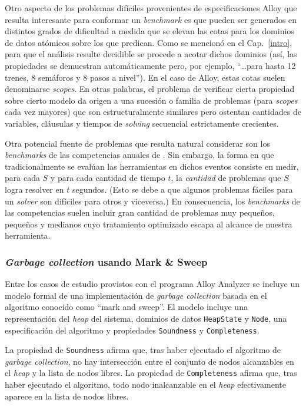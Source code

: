 Otro aspecto de los problemas difíciles provenientes de especificaciones Alloy que resulta interesante para conformar un \emph{benchmark} es que pueden ser generados en distintos grados de dificultad a medida que se elevan las cotas para los dominios de datos atómicos sobre los que predican. Como se mencionó en el Cap.~\ref{intro}, para que el análisis resulte decidible se procede a acotar dichos dominios (así, las propiedades se demuestran automáticamente pero, por ejemplo, ``\ldots para hasta 12 trenes, 8 semáforos y 8 pasos a nivel''). En el caso de Alloy, estas cotas suelen denominarse \emph{scopes}. En otras palabras, el problema de verificar cierta propiedad sobre cierto modelo da origen a una sucesión o familia de problemas (para \emph{scopes} cada vez mayores) que son estructuralmente similares pero ostentan cantidades de variables, cláusulas y tiempos de \emph{solving} secuencial estrictamente crecientes.

Otra potencial fuente de problemas que resulta natural considerar son los \emph{benchmarks} de las competencias anuales de \ssolving. Sin embargo, la forma en que tradicionalmente se evalúan las herramientas en dichos eventos consiste en medir, para cada \ssolver $S$ y para cada cantidad de tiempo $t$, la \emph{cantidad} de problemas que $S$ logra resolver en $t$ segundos. (Esto se debe a que algunos problemas fáciles para un \emph{solver} son difíciles para otros y viceversa.) En consecuencia, los \emph{benchmarks} de las competencias suelen incluir gran cantidad de problemas muy pequeños, pequeños y medianos cuyo tratamiento optimizado escapa al alcance de nuestra herramienta.


\subsubsection{\emph{Garbage collection} usando Mark \& Sweep}

Entre los casos de estudio provistos con el programa Alloy Analyzer se incluye un modelo formal de una implementación de \emph{garbage collection} basada en el algoritmo conocido como ``mark and sweep''. El modelo incluye una representación del \emph{heap} del sistema, dominios de datos \texttt{HeapState} y \texttt{Node}, una especificación del algoritmo y propiedades \texttt{Soundness} y \texttt{Completeness}.

La propiedad de \texttt{Soundness} afirma que, tras haber ejecutado el algoritmo de \emph{garbage collection}, no hay intersección entre el conjunto de nodos alcanzables en el \emph{heap} y la lista de nodos libres. La propiedad de \texttt{Completeness} afirma que, tras haber ejecutado el algoritmo, todo nodo inalcanzable en el \emph{heap} efectivamente aparece en la lista de nodos libres.

